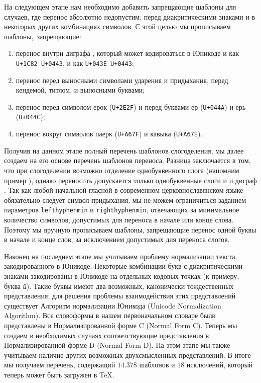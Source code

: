 \documentclass[12pt,a4paper,oneside]{extarticle}
\begin{document}
На следующем этапе нам необходимо добавить запрещающие шаблоны для случаев, где перенос абсолютно недопустим: перед диакритическими знаками и в некоторых других комбинациях символов. С этой целью мы прописываем шаблоны, запрещающие:

\begin{enumerate}
\item перенос внутри диграфа , который может кодироваться в Юникоде и как \verb!U+1C82 U+0443!, и как \verb!U+043E U+0443!;
\item перенос перед выносными символами ударения и придыхания, перед кендемой, титлом, и выносными буквами\autocite[Полный перечень символов вместе с их кодовыми точками в Юникоде, а также полный перечень возможных слов с титлом или буквенными титлами см. ][]{utn41};
\item перенос перед символом ерок (\verb!U+2E2F!) и перед буквами ер (\verb!U+044A!) и ерь (\verb!U+044C!);
\item перенос вокруг символов паерк (\verb!U+A67F!) и кавыка (\verb!U+A67E!).
\end{enumerate}

Получив на данном этапе полный перечень шаблонов слогоделения, мы далее создаем на его основе перечень шаблонов переноса. Разница заключается в том, что при слогоделении возможно отделение однобуквенного слога (напомним пример ), однако переносить допускается только однобуквенные слоги  и  и диграф . Так как любой начальной гласной в современном церковнославянском языке обязательно следует символ придыхания, мы не можем ограничиться заданием параметров \verb+lefthyphenmin+ и \verb+righthyphenmin+, отвечающих за минимальное количество символов, допустимых для переноса в начале или конце слова. Поэтому мы вручную прописываем шаблоны, запрещающие перенос одной буквы в начале и конце слов, за исключением допустимых для переноса слогов.

Наконец на последнем этапе мы учитываем проблему нормализации текста, закодированного в Юникоде. Некоторые комбинации букв с диакритическими знаками закодированы в Юникоде на отдельных кодовых точках (к примеру, буква \emph{й}). Такие буквы имеют два возможных, канонически тождественных представления; для решения проблемы взаимодействия этих представлений существует Алгоритм нормализации Юникода (\textenglish{Unicode Normalization Algorithm})\autocite[Подробности см. ][]{tr15}. Все словоформы в нашем первоначальном словаре были представлены в Нормализированной форме C (\textenglish{Normal Form C}). Теперь мы создаем в необходимых случаях соответствующие представления в Нормализированной форме D (\textenglish{Normal Form D}). На этом этапе мы также учитываем наличие других возможных двухсмысленных представлений\autocite[Специфику нормализации церковнославянского текста см. в работе ][]{utn41}. В итоге мы получаем перечень, содержащий $14.378$ шаблонов и $18$ исключений, который теперь может быть загружен в \TeX{}.
\end{document}

